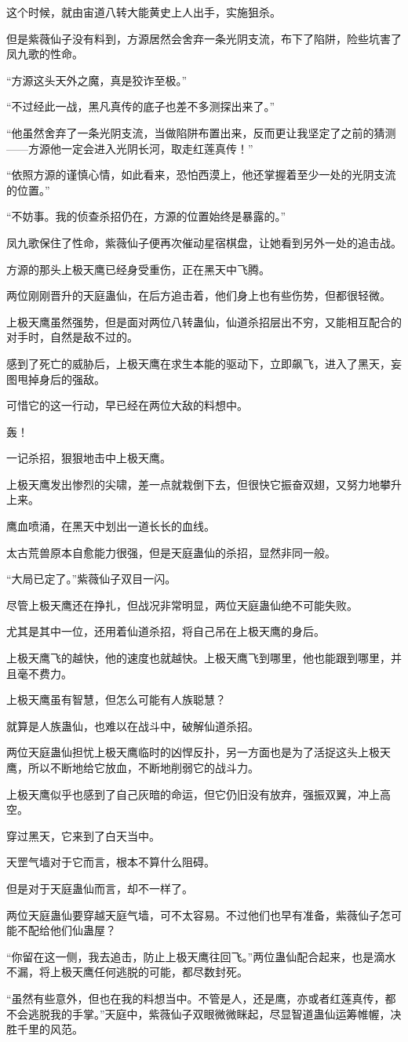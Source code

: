 \begin{this_body}
这个时候，就由宙道八转大能黄史上人出手，实施狙杀。

但是紫薇仙子没有料到，方源居然会舍弃一条光阴支流，布下了陷阱，险些坑害了凤九歌的性命。

“方源这头天外之魔，真是狡诈至极。”

“不过经此一战，黑凡真传的底子也差不多测探出来了。”

“他虽然舍弃了一条光阴支流，当做陷阱布置出来，反而更让我坚定了之前的猜测——方源他一定会进入光阴长河，取走红莲真传！”

“依照方源的谨慎心情，如此看来，恐怕西漠上，他还掌握着至少一处的光阴支流的位置。”

“不妨事。我的侦查杀招仍在，方源的位置始终是暴露的。”

凤九歌保住了性命，紫薇仙子便再次催动星宿棋盘，让她看到另外一处的追击战。

方源的那头上极天鹰已经身受重伤，正在黑天中飞腾。

两位刚刚晋升的天庭蛊仙，在后方追击着，他们身上也有些伤势，但都很轻微。

上极天鹰虽然强势，但是面对两位八转蛊仙，仙道杀招层出不穷，又能相互配合的对手时，自然是敌不过的。

感到了死亡的威胁后，上极天鹰在求生本能的驱动下，立即飙飞，进入了黑天，妄图甩掉身后的强敌。

可惜它的这一行动，早已经在两位大敌的料想中。

轰！

一记杀招，狠狠地击中上极天鹰。

上极天鹰发出惨烈的尖啸，差一点就栽倒下去，但很快它振奋双翅，又努力地攀升上来。

鹰血喷涌，在黑天中划出一道长长的血线。

太古荒兽原本自愈能力很强，但是天庭蛊仙的杀招，显然非同一般。

“大局已定了。”紫薇仙子双目一闪。

尽管上极天鹰还在挣扎，但战况非常明显，两位天庭蛊仙绝不可能失败。

尤其是其中一位，还用着仙道杀招，将自己吊在上极天鹰的身后。

上极天鹰飞的越快，他的速度也就越快。上极天鹰飞到哪里，他也能跟到哪里，并且毫不费力。

上极天鹰虽有智慧，但怎么可能有人族聪慧？

就算是人族蛊仙，也难以在战斗中，破解仙道杀招。

两位天庭蛊仙担忧上极天鹰临时的凶悍反扑，另一方面也是为了活捉这头上极天鹰，所以不断地给它放血，不断地削弱它的战斗力。

上极天鹰似乎也感到了自己灰暗的命运，但它仍旧没有放弃，强振双翼，冲上高空。

穿过黑天，它来到了白天当中。

天罡气墙对于它而言，根本不算什么阻碍。

但是对于天庭蛊仙而言，却不一样了。

两位天庭蛊仙要穿越天庭气墙，可不太容易。不过他们也早有准备，紫薇仙子怎可能不配给他们仙蛊屋？

“你留在这一侧，我去追击，防止上极天鹰往回飞。”两位蛊仙配合起来，也是滴水不漏，将上极天鹰任何逃脱的可能，都尽数封死。

“虽然有些意外，但也在我的料想当中。不管是人，还是鹰，亦或者红莲真传，都不会逃脱我的手掌。”天庭中，紫薇仙子双眼微微眯起，尽显智道蛊仙运筹帷幄，决胜千里的风范。

\end{this_body}

